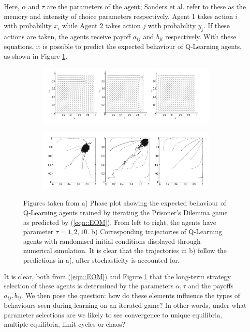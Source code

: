 \documentclass[.../main.tex]{subfiles}
\begin{document}
	Here, $\alpha$ and $\tau$ are the parameters of the agent; Sanders et al. refer to these as the
	memory and intensity of choice parameters respectively. Agent 1 takes action $i$ with probability
	$x_i$ while Agent 2 takes action $j$ with probability $y_j$. If these actions are taken, the agents
	receive payoff $a_{ij}$ and $b_{ji}$ respectively. With these equations, it is possible to
	predict the expected behaviour of Q-Learning agents, as shown in Figure 
	\ref{fig::TuylsExperiments}.

	\begin{figure}[h]
		\centering
		\begin{subfigure}[b]{0.9 \textwidth}
			\centering
			\includegraphics[width=0.75 \textwidth]{Figures/Dynamics}
			\caption{}
		\end{subfigure}
		
		\begin{subfigure}[b]{0.9 \textwidth}
			\centering
			\includegraphics[width=0.7 \textwidth]{Figures/Q-Learners}
			\caption{}
		\end{subfigure}

		\caption{ \label{fig::TuylsExperiments} Figures taken from \cite{Tuyls2006AnGames} a) Phase
		plot showing the expected behaviour of Q-Learning agents trained by iterating the
		Prisoner's Dilemma game as predicted by (\ref{eqn::EOM}). From left to right, the agents
		have parameter $\tau = 1, 2, 10$. b) Corresponding trajectories of Q-Learning agents with
		randomised initial conditions displayed through numerical simulation. It is clear that the
		trajectories in b) follow the predictions in a), after stochasticity is accounted for. }
	\end{figure}	

	It is clear, both from (\ref{eqn::EOM}) and Figure \ref{fig::TuylsExperiments} that the long-term strategy selection of
	these agents is determined by the parameters $\alpha, \tau$ and the payoffs $a_{ij}, b_{ij}$. We
	then pose the question: how do these elements influence the types of behaviours seen during
	learning on an iterated game? In other words, under what parameter selections are we likely to
	see convergence to unique equilibria, multiple equilibria, limit cycles or chaos?
\end{document}
